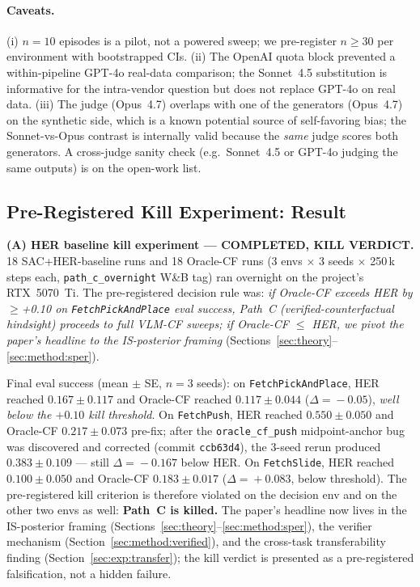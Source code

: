 \documentclass{article}
\begin{document}
\paragraph{Caveats.}
(i) $n\!=\!10$ episodes is a pilot, not a powered sweep; we pre-register
$n\!\ge\!30$ per environment with bootstrapped CIs. (ii) The OpenAI quota
block prevented a within-pipeline GPT-4o real-data comparison; the
Sonnet~4.5 substitution is informative for the intra-vendor question
but does not replace GPT-4o on real data. (iii) The judge (Opus~4.7)
overlaps with one of the generators (Opus~4.7) on the synthetic side,
which is a known potential source of self-favoring bias; the Sonnet-vs-Opus
contrast is internally valid because the \emph{same} judge scores both
generators. A cross-judge sanity check (e.g.\ Sonnet~4.5 or GPT-4o
judging the same outputs) is on the open-work list.

\subsection{Pre-Registered Kill Experiment: Result}
\label{sec:exp:inflight}

\textbf{(A) HER baseline kill experiment --- COMPLETED, KILL VERDICT.}
18 SAC+HER-baseline runs and 18 Oracle-CF runs
(3 envs $\times$ 3 seeds $\times$ 250\,k steps each, \texttt{path\_c\_overnight}
W\&B tag) ran overnight on the project's RTX~5070~Ti. The pre-registered
decision rule was: \emph{if Oracle-CF exceeds HER by $\ge$+0.10 on
\texttt{FetchPickAndPlace} eval success, Path~C (verified-counterfactual
hindsight) proceeds to full VLM-CF sweeps; if Oracle-CF $\le$ HER, we pivot
the paper's headline to the IS-posterior framing} (Sections~\ref{sec:theory}--\ref{sec:method:sper}).

Final eval success (mean $\pm$ SE, $n\!=\!3$ seeds): on
\texttt{FetchPickAndPlace}, HER reached $0.167\!\pm\!0.117$ and Oracle-CF
reached $0.117\!\pm\!0.044$ ($\Delta\!=\!-0.05$), \emph{well below the
$+0.10$ kill threshold}. On \texttt{FetchPush}, HER reached
$0.550\!\pm\!0.050$ and Oracle-CF $0.217\!\pm\!0.073$ pre-fix; after the
\texttt{oracle\_cf\_push} midpoint-anchor bug was discovered and corrected
(commit \texttt{ccb63d4}), the 3-seed rerun produced
$0.383\!\pm\!0.109$ --- still $\Delta\!=\!-0.167$ below HER. On
\texttt{FetchSlide}, HER reached $0.100\!\pm\!0.050$ and Oracle-CF
$0.183\!\pm\!0.017$ ($\Delta\!=\!+0.083$, below threshold).
The pre-registered kill criterion is therefore violated on the decision
env and on the other two envs as well: \textbf{Path~C is killed.} The
paper's headline now lives in the IS-posterior framing
(Sections~\ref{sec:theory}--\ref{sec:method:sper}), the verifier mechanism
(Section~\ref{sec:method:verified}), and the cross-task transferability
finding (Section~\ref{sec:exp:transfer}); the kill verdict is presented
as a pre-registered falsification, not a hidden failure.
\end{document}
